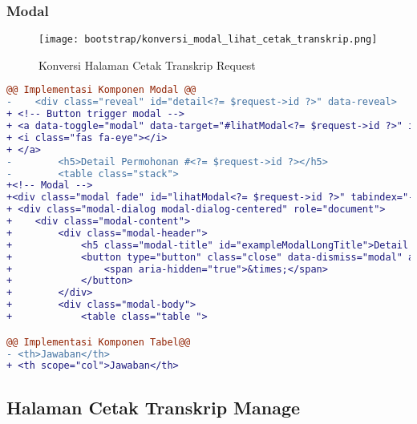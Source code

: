 \subsubsection{Modal}
\begin{figure} [H]
	\centering  
	\texttt{[image: bootstrap/konversi\_modal\_lihat\_cetak\_transkrip.png]}  
	\caption{Konversi Halaman Cetak Transkrip Request} 
\end{figure}
\begin{lstlisting}[language=diff, caption=Kode untuk Modal Cetak Transkrip Manage, label=Entri, basicstyle=\ttfamily, frame=single,
columns=fullflexible, keepspaces=true, breaklines=true]
@@ Implementasi Komponen Modal @@
-    <div class="reveal" id="detail<?= $request->id ?>" data-reveal>
+ <!-- Button trigger modal -->
+ <a data-toggle="modal" data-target="#lihatModal<?= $request->id ?>" id="detail<?= $request->id ?>">
+ <i class="fas fa-eye"></i>
+ </a>
-        <h5>Detail Permohonan #<?= $request->id ?></h5>
-        <table class="stack">
+<!-- Modal -->
+<div class="modal fade" id="lihatModal<?= $request->id ?>" tabindex="-1" role="dialog" aria-labelledby="exampleModalCenterTitle" aria-hidden="true">
+ <div class="modal-dialog modal-dialog-centered" role="document">
+    <div class="modal-content">
+        <div class="modal-header">
+            <h5 class="modal-title" id="exampleModalLongTitle">Detail Permohonan #<?= $request->id ?></h5>
+            <button type="button" class="close" data-dismiss="modal" aria-label="Close">
+                <span aria-hidden="true">&times;</span>
+            </button>
+        </div>
+        <div class="modal-body">
+            <table class="table ">

@@ Implementasi Komponen Tabel@@
- <th>Jawaban</th>
+ <th scope="col">Jawaban</th>
\end{lstlisting}

\subsection{Halaman Cetak Transkrip Manage}
